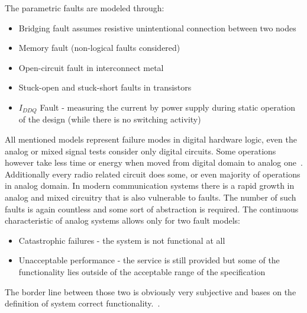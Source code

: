 The parametric faults are modeled through:
\begin{itemize}
    \item Bridging fault assumes resistive unintentional connection between two nodes
    \item Memory fault (non-logical faults considered)
    \item Open-circuit fault in interconnect metal
    \item Stuck-open and stuck-short faults in transistors
    \item $I_{DDQ}$ Fault - measuring the current by power supply during static operation of the design (while there is no switching activity)
\end{itemize}
All mentioned models represent failure modes in digital hardware logic, even the analog or mixed signal tests consider only digital circuits. Some operations however take less time or energy when moved from digital domain to analog one~\cite{Prof Vierhaus Lectures}. Additionally every radio related circuit does some, or even majority of operations in analog domain. In modern communication systems there is a rapid growth in analog and mixed circuitry that is also vulnerable to faults. The number of such faults is again countless and some sort of abstraction is required. The continuous characteristic of analog systems allows only for two fault models:
\begin{itemize}
    \item Catastrophic failures - the system is not functional at all
    \item Unacceptable performance - the service is still provided but some of the functionality lies outside of the acceptable range of the specification
\end{itemize}
The border line between those two is obviously very subjective and bases on the definition of system correct functionality.~\cite{book:Kabisatpathy}.
